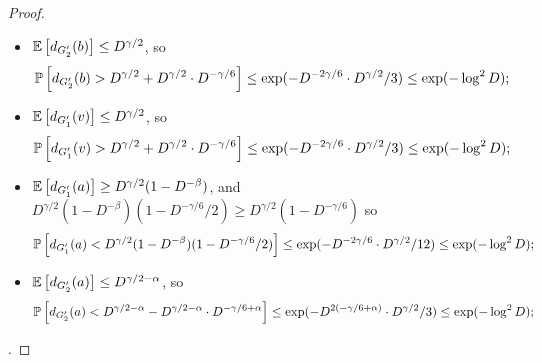 \documentclass[11pt]{article}
\numberwithin{equation}{section}
\newcounter{i}
\theoremstyle{plain}
\theoremstyle{plain} %
\theoremstyle{definition}
\newcommand{\Prob}[1]{\ensuremath{%
\mathbb P\left[#1\right]
}}
\newcommand{\Expect}[1]{\ensuremath{%
\mathbb E\left[#1\right]
}}
\begin{document}
\begin{proof}
{\begin{itemize}
\begin{equation*}
          \Prob{d_{G'}(\{u,v\}) > (\log^2D \cdot D^{\beta-\gamma/2})D^{\gamma/2 - \beta}} \leq (\log^2D \cdot D^{\beta-\gamma/2} / e)^{-\log^2 D} \leq \exp(-\log^2 D);
      \end{equation*}
      \item $\Expect{d_{G'_2}(b)} \leq D^{\gamma/2}$, so
      \begin{equation*}
          \Prob{d_{G'_2}(b) > D^{\gamma/2} + D^{\gamma/2}\cdot D^{-\gamma/6}} \leq \exp(-D^{-2\gamma/6}\cdot D^{\gamma/2}/3) \leq \exp(-\log^2 D);
      \end{equation*}
      \item $\Expect{d_{G'_1}(v)} \leq D^{\gamma/2}$, so
      \begin{equation*}
          \Prob{d_{G'_1}(v) > D^{\gamma/2} + D^{\gamma/2}\cdot D^{-\gamma/6}} \leq \exp(-D^{-2\gamma/6}\cdot D^{\gamma/2}/3) \leq \exp(-\log^2 D);
      \end{equation*}
      \item $\Expect{d_{G'_1}(a)} \geq D^{\gamma/2}(1 - D^{-\beta})$, and $D^{\gamma/2}(1 - D^{-\beta})(1 - D^{-\gamma/6}/2) \geq D^{\gamma/2}(1 - D^{-\gamma/6})$ so 
      \begin{equation*}
          \Prob{d_{G'_1}(a) < D^{\gamma/2}(1 - D^{-\beta})(1 - D^{-\gamma/6}/2)} \leq \exp(-D^{-2\gamma/6}\cdot D^{\gamma/2}/12) \leq \exp(-\log^2 D);
      \end{equation*}
      \item $\Expect{d_{G'_2}(a)} \leq D^{\gamma/2 - \alpha}$, so
      \begin{equation*}
          \Prob{d_{G'_2}(a) < D^{\gamma/2 - \alpha} - D^{\gamma/2 - \alpha}\cdot D^{-\gamma/6+\alpha}} \leq \exp(-D^{2(-\gamma/6+\alpha)}\cdot D^{\gamma/2}/3) \leq \exp(-\log^2 D);
      \end{equation*}
  \end{itemize}
  }.


\end{proof}
\end{document}
